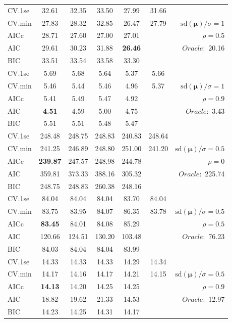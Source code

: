 \begin{table}
\begin{center}
\begin{tabular}{l*{5}{c}|r}
 \hline 
CV.1se & 32.61 & 32.35 & 33.50 & 27.99 & 31.66 & \\
CV.min & 27.83 & 28.32 & 32.85 & 26.47 & 27.79 &  $\mathrm{sd}(\mathbf{\mu})/\sigma=1$ \\
AICc & 28.71 & 27.60 & 27.00 & 27.01 & & $\rho=0.5$ \\
AIC & 29.61 & 30.23 & 31.88 & {\bf 26.46} & &  \multirow{2}{*}{$Oracle: $ 20.16} \\
BIC & 33.51 & 33.54 & 33.58 & 33.30 & &  \\
 \hline 
CV.1se & 5.69 & 5.68 & 5.64 & 5.37 & 5.66 & \\
CV.min & 5.46 & 5.44 & 5.46 & 4.96 & 5.37 &  $\mathrm{sd}(\mathbf{\mu})/\sigma=1$ \\
AICc & 5.41 & 5.49 & 5.47 & 4.92 & & $\rho=0.9$ \\
AIC & {\bf 4.51} & 4.59 & 5.00 & 4.75 & &  \multirow{2}{*}{$Oracle: $ 3.43} \\
BIC & 5.51 & 5.51 & 5.48 & 5.47 & &  \\
 \hline 
CV.1se & 248.48 & 248.75 & 248.83 & 240.83 & 248.64 & \\
CV.min & 241.25 & 246.89 & 248.80 & 251.00 & 241.20 &  $\mathrm{sd}(\mathbf{\mu})/\sigma=0.5$ \\
AICc & {\bf 239.87} & 247.57 & 248.98 & 244.78 & & $\rho=0$ \\
AIC & 359.81 & 373.33 & 388.16 & 305.32 & &  \multirow{2}{*}{$Oracle: $ 225.74} \\
BIC & 248.75 & 248.83 & 260.38 & 248.16 & &  \\
 \hline 
CV.1se & 84.04 & 84.04 & 84.04 & 83.70 & 84.04 & \\
CV.min & 83.75 & 83.95 & 84.07 & 86.35 & 83.78 &  $\mathrm{sd}(\mathbf{\mu})/\sigma=0.5$ \\
AICc & {\bf 83.45} & 84.01 & 84.08 & 85.29 & & $\rho=0.5$ \\
AIC & 120.66 & 124.51 & 130.20 & 103.48 & &  \multirow{2}{*}{$Oracle: $ 76.23} \\
BIC & 84.03 & 84.04 & 84.04 & 83.99 & &  \\
 \hline 
CV.1se & 14.33 & 14.33 & 14.33 & 14.29 & 14.34 & \\
CV.min & 14.17 & 14.16 & 14.17 & 14.21 & 14.15 &  $\mathrm{sd}(\mathbf{\mu})/\sigma=0.5$ \\
AICc & {\bf 14.13} & 14.20 & 14.25 & 14.25 & & $\rho=0.9$ \\
AIC & 18.82 & 19.62 & 21.33 & 14.53 & &  \multirow{2}{*}{$Oracle: $ 12.97} \\
BIC & 14.23 & 14.25 & 14.31 & 14.17 & &  \\
 \hline 
\end{tabular}
\end{center}
\vspace{-1cm}
\end{table}





